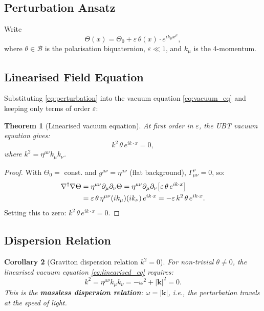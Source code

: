 \documentclass[11pt,a4paper]{article}
\newtheorem{theorem}{Theorem}[section]
\newtheorem{corollary}[theorem]{Corollary}
\theoremstyle{definition}
\theoremstyle{remark}
\begin{document}
\subsection{Perturbation Ansatz}

Write
\begin{equation}
  \Theta(x) = \Theta_0 + \varepsilon\,\theta(x)\cdot e^{ik_\mu x^\mu},
  \label{eq:perturbation}
\end{equation}
where $\theta \in \mathcal{B}$ is the polarisation biquaternion,
$\varepsilon \ll 1$, and $k_\mu$ is the 4-momentum.

\subsection{Linearised Field Equation}

Substituting \eqref{eq:perturbation} into the vacuum equation
\eqref{eq:vacuum_eq} and keeping only terms of order $\varepsilon$:

\begin{theorem}[Linearised vacuum equation]
\label{thm:linearised}
At first order in $\varepsilon$, the UBT vacuum equation gives:
\begin{equation}
  k^2\,\theta\,e^{ik\cdot x} = 0,
  \label{eq:linearised_eq}
\end{equation}
where $k^2 = \eta^{\mu\nu}k_\mu k_\nu$.
\end{theorem}

\begin{proof}
With $\Theta_0 = $ const. and $g^{\mu\nu} = \eta^{\mu\nu}$ (flat background),
$\Gamma^\rho_{\mu\nu} = 0$, so:
\begin{align}
  \nabla^\dagger\nabla\Theta
  &= \eta^{\mu\nu}\partial_\mu\partial_\nu\Theta
  = \eta^{\mu\nu}\partial_\mu\partial_\nu\bigl[\varepsilon\,\theta\,e^{ik\cdot x}\bigr]
  \notag\\
  &= \varepsilon\,\theta\,\eta^{\mu\nu}(ik_\mu)(ik_\nu)\,e^{ik\cdot x}
  = -\varepsilon\,k^2\,\theta\,e^{ik\cdot x}.
  \label{eq:dAlembert_result}
\end{align}
Setting this to zero: $k^2\,\theta\,e^{ik\cdot x} = 0$.
\end{proof}

\subsection{Dispersion Relation}

\begin{corollary}[Graviton dispersion relation $k^2 = 0$]
\label{cor:dispersion}
For non-trivial $\theta \neq 0$, the linearised vacuum equation
\eqref{eq:linearised_eq} requires:
\begin{equation}
  k^2 = \eta^{\mu\nu}k_\mu k_\nu = -\omega^2 + |\mathbf{k}|^2 = 0.
  \label{eq:dispersion}
\end{equation}
This is the \textbf{massless dispersion relation}: $\omega = |\mathbf{k}|$,
i.e., the perturbation travels at the speed of light.
\end{corollary}
\end{document}
